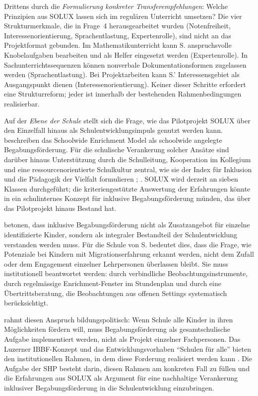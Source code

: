 \documentclass[ngerman, a4paper]{article}
\begin{document}
Drittens durch die \textit{Formulierung konkreter Transferempfehlungen}:
Welche Prinzipien aus SOLUX lassen sich im regulären Unterricht umsetzen?
Die vier Strukturmerkmale, die in Frage~4 herausgearbeitet wurden
(Notenfreiheit, Interessenorientierung, Sprachentlastung, Expertenrolle),
sind nicht an das Projektformat gebunden. Im Mathematikunterricht kann S.
anspruchsvolle Knobelaufgaben bearbeiten und als Helfer eingesetzt werden
(Expertenrolle). In Sachunterrichtssequenzen können nonverbale
Dokumentationsformen zugelassen werden (Sprachentlastung). Bei
Projektarbeiten kann S.' Interessensgebiet als Ausgangspunkt dienen
(Interessenorientierung). Keiner dieser Schritte erfordert eine
Strukturreform; jeder ist innerhalb der bestehenden Rahmenbedingungen
realisierbar.

Auf der \textit{Ebene der Schule} stellt sich die Frage, wie das
Pilotprojekt SOLUX über den Einzelfall hinaus als Schulentwicklungsimpuls
genutzt werden kann. \textcite[S.\,333--347]{reisrenzullimueller2021sem}
beschreiben das Schoolwide Enrichment Model als schoolwide angelegte
Begabungsförderung. Für die schulische Verankerung solcher Ansätze sind
darüber hinaus Unterstützung durch die Schulleitung, Kooperation im Kollegium
und eine ressourcenorientierte Schulkultur zentral, wie sie der Index für
Inklusion und die Pädagogik der Vielfalt formulieren
\parencite{booth2019index};
\parencite[S.\,9--10]{buholzerkummerwyss2010heterogenitaet}. SOLUX wird derzeit an sieben
Klassen durchgeführt; die kriteriengestützte Auswertung der Erfahrungen
könnte in ein schulinternes Konzept für inklusive Begabungsförderung
münden, das über das Pilotprojekt hinaus Bestand hat.

\textcite[S.\,290--298]{weigand2021separativ} betonen, dass inklusive Begabungsförderung nicht als
Zusatzangebot für einzelne identifizierte Kinder, sondern als integraler
Bestandteil der Schulentwicklung verstanden werden muss. Für die Schule von S. bedeutet dies,
dass die Frage, wie Potenziale bei Kindern mit Migrationserfahrung erkannt
werden, nicht dem Zufall oder dem Engagement einzelner Lehrpersonen
überlassen bleibt. Sie muss institutionell beantwortet werden: durch
verbindliche Beobachtungsinstrumente, durch regelmässige Enrichment-Fenster
im Stundenplan und durch eine Übertrittsberatung, die Beobachtungen aus
offenen Settings systematisch berücksichtigt.

\textcite[S.\,32--45]{muelleroppliger2021plurale} rahmt diesen Anspruch bildungspolitisch: Wenn Schule alle
Kinder in ihren Möglichkeiten fördern will, muss Begabungsförderung als
gesamtschulische Aufgabe implementiert werden, nicht als Projekt einzelner
Fachpersonen. Das Luzerner
IBBF-Konzept und das Entwicklungsvorhaben \enquote{Schulen für alle} bieten
den institutionellen Rahmen, in dem diese Forderung realisiert werden kann
\parencite{dvs2025bbf}. Die Aufgabe der SHP besteht darin, diesen Rahmen
am konkreten Fall zu füllen und die Erfahrungen aus SOLUX als Argument für
eine nachhaltige Verankerung inklusiver Begabungsförderung in die
Schulentwicklung einzubringen.
\end{document}
